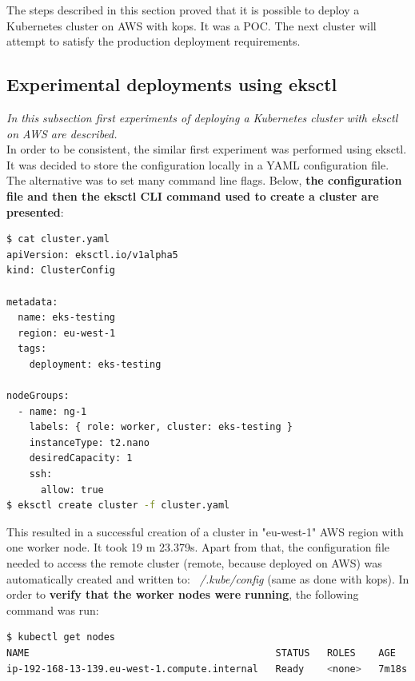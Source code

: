 The steps described in this section proved that it is possible to deploy a Kubernetes cluster on AWS with kops. It was a POC. The next cluster will attempt to satisfy the production deployment requirements.

\subsection{Experimental deployments using eksctl}
\textit{In this subsection first experiments of deploying a Kubernetes cluster with eksctl on AWS are described.}
\\

In order to be consistent, the similar first experiment was performed using eksctl. It was decided to store the configuration locally in a YAML configuration file. The alternative was to set many command line flags. Below, \textbf{the configuration file and then the eksctl CLI command used to create a cluster are presented}:
\begin{lstlisting}[basicstyle=\tiny,caption={Commands used to create a cluster with eksctl, without prerequisite steps performed},captionpos=b,language=Bash,xleftmargin=1cm]
$ cat cluster.yaml
apiVersion: eksctl.io/v1alpha5
kind: ClusterConfig

metadata:
  name: eks-testing
  region: eu-west-1
  tags:
    deployment: eks-testing

nodeGroups:
  - name: ng-1
    labels: { role: worker, cluster: eks-testing }
    instanceType: t2.nano
    desiredCapacity: 1
    ssh:
      allow: true
$ eksctl create cluster -f cluster.yaml
\end{lstlisting}

This resulted in a successful creation of a cluster in "eu-west-1" AWS region with one worker node. It took 19 m 23.379s. Apart from that, the configuration file needed to access the remote cluster (remote, because deployed on AWS) was automatically created and written to: \textit{~/.kube/config} (same as done with kops). In order to \textbf{verify that the worker nodes were running}, the following command was run:
\begin{lstlisting}[basicstyle=\tiny,caption={Command used to list Kubernetes worker nodes to verify that one such node was running},captionpos=b,language=Bash,xleftmargin=1cm]
$ kubectl get nodes
NAME                                           STATUS   ROLES    AGE     VERSION
ip-192-168-13-139.eu-west-1.compute.internal   Ready    <none>   7m18s   v1.16.8-eks-e16311
\end{lstlisting}

